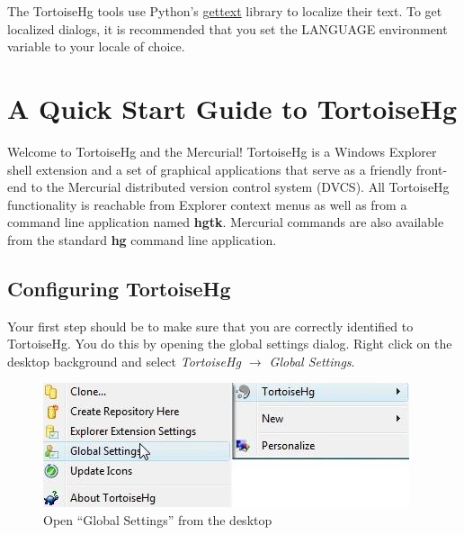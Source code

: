 \documentclass[letterpaper,10pt,english]{manual}
\begin{document}
The TortoiseHg tools use Python's
\href{http://docs.python.org/library/gettext.html}{gettext} library to
localize their text.  To get localized dialogs, it is recommended that
you set the LANGUAGE environment variable to your locale of choice.

\resetcurrentobjects
\hypertarget{--doc-quick}{}

\chapter{A Quick Start Guide to TortoiseHg}
\hypertarget{module-tour}{}
Welcome to TortoiseHg and the Mercurial!  TortoiseHg is a Windows
Explorer shell extension and a set of graphical applications that serve
as a friendly front-end to the Mercurial distributed version control
system (DVCS).   All TortoiseHg functionality is reachable from Explorer
context menus as well as from a command line application named
\textbf{hgtk}.  Mercurial commands are also available from the
standard \textbf{hg} command line application.


\section{Configuring TortoiseHg}

Your first step should be to make sure that you are correctly identified
to TortoiseHg.  You do this by opening the global settings dialog.
Right click on the desktop background and select
\emph{TortoiseHg \(\rightarrow\) Global Settings}.
\begin{figure}[htbp]
\centering

\includegraphics{cmenu-global-settings.jpg}
\caption{Open ``Global Settings'' from the desktop}\end{figure}
\end{document}
